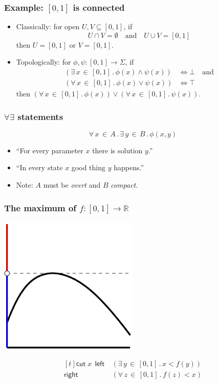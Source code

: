 \documentclass{beamer}
\newcommand{\prop}{\Sigma}
\newcommand{\RR}{\mathbb{R}}
\newcommand{\xall}[3]{\forall\, #1 \,{\in}\, #2\,.\,#3}
\newcommand{\xsome}[3]{\exists\, #1 \,{\in}\, #2\,.\,#3}
\newcommand{\xcut}[3]{\begin{aligned}[t]
\mathsf{cut}\; #1 \ \ \mathsf{left}\  &#2 \\
\mathsf{right}\ &#3 
\end{aligned}}
\begin{document}
\begin{frame}
  \frametitle{Example: $[0,1]$ is connected}

  \begin{itemize}
  \item Classically: for open $U, V \subseteq [0,1]$, if
    \begin{equation*}
      U \cap V = \emptyset \quad\text{and}\quad U \cup V = [0,1] 
    \end{equation*}
    then $U = [0,1]$ or $V = [0,1]$.
  \item Topologically: for $\phi, \psi : [0,1] \to \prop$, if
    \begin{align*}
      (\xsome{x}{[0,1]}{\phi(x) \land \psi(x)}) &\iff \bot \quad\text{and}\\
      (\xall{x}{[0,1]}{\phi(x) \lor \psi(x)}) &\iff \top
    \end{align*}
    then $(\xall{x}{[0,1]}{\phi(x)}) \lor (\xall{x}{[0,1]}{\psi(x)})$.
  \end{itemize}
\end{frame}

\begin{frame}
  \frametitle{$\forall\exists$ statements}

  {\LARGE
  \begin{equation*}
    \xall{x}{A}{\xsome{y}{B}{\phi(x,y)}}
  \end{equation*}}

  \pause

  \begin{itemize}
  \item ``For every parameter $x$ there is solution $y$.''
  \item ``In every state $x$ good thing $y$ happens.''
  \item Note: $A$ must be \emph{overt} and $B$ \emph{compact}.
  \end{itemize}
\end{frame}

\begin{frame}
  \frametitle{The maximum of $f : [0,1] \to \RR$}

    \begin{center}
      \includegraphics[width=0.5\textwidth]{max}
    \end{center}

    \begin{equation*}
      \xcut{x}{(\xsome{y}{[0,1]}{x < f(y)})}{(\xall{z}{[0,1]}{f(z) < x})}
    \end{equation*}
\end{frame}
\end{document}
